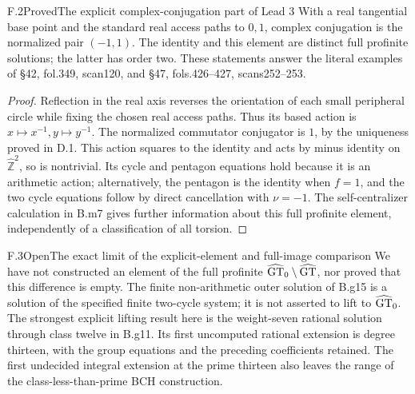 \begin{claim}{F.2}{Proved}{The explicit complex-conjugation part of Lead 3}
With a real tangential base point and the standard real access paths
to $0,1$, complex conjugation is the normalized pair $(-1,1)$.
The identity and this element are distinct full profinite solutions;
the latter has order two. These statements answer the literal examples
of \S42, fol.349\textquotesingle, scan120, and \S47, fols.426--427, scans252--253.
\end{claim}
\begin{proof}
Reflection in the real axis reverses the orientation of each small
peripheral circle while fixing the chosen real access paths. Thus its
based action is $x\mapsto x^{-1},y\mapsto y^{-1}$. The normalized
commutator conjugator is $1$, by the uniqueness proved in D.1.
This action squares to the identity and acts by minus identity on
$\widehat{\mathbb Z}^2$, so is nontrivial. Its cycle and pentagon
equations hold because it is an arithmetic action; alternatively,
the pentagon is the identity when $f=1$, and the two cycle equations
follow by direct cancellation with $\nu=-1$. The self-centralizer
calculation in B.m7 gives further information about this full
profinite element, independently of a classification of all torsion.
\end{proof}

\begin{claim}{F.3}{Open}{The exact limit of the explicit-element and full-image comparison}
We have not constructed an element of the full profinite
$\widehat{\mathrm{GT}}_0\setminus\widehat{\mathrm{GT}}$, nor proved that this difference is empty.
The finite non-arithmetic outer solution of B.g15 is a solution of
the specified finite two-cycle system; it is not asserted to lift
to $\widehat{\mathrm{GT}}_0$. The strongest explicit lifting result here is the
weight-seven rational solution through class twelve in B.g11.
Its first uncomputed rational extension is degree thirteen, with
the group equations and the preceding coefficients retained.
The first undecided integral extension at the prime thirteen also
leaves the range of the class-less-than-prime BCH construction.
\end{claim}

